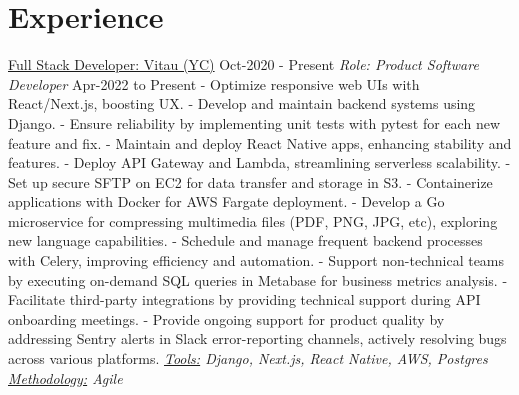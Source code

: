 \documentclass[letterpaper]{twentysecondcv} %
\begin{document}
\section{Experience}
\newline\newline 
{\large\underline{Full Stack Developer: Vitau (YC)}}  \hspace*{105pt}  Oct-2020 - Present
\newline\newline
{\textit{Role: Product Software Developer}} \hspace*{131pt} Apr-2022 to Present
    \newline- Optimize responsive web UIs with React/Next.js, boosting UX.
    \newline- Develop and maintain backend systems using Django.
    \newline- Ensure reliability by implementing unit tests with pytest for each new feature and fix.
    \newline- Maintain and deploy React Native apps, enhancing stability and features.
    \newline- Deploy API Gateway and Lambda, streamlining serverless scalability.
    \newline- Set up secure SFTP on EC2 for data transfer and storage in S3.
    \newline- Containerize applications with Docker for AWS Fargate deployment.
    \newline- Develop a Go microservice for compressing multimedia files (PDF, PNG, JPG, etc), exploring new language capabilities.
    \newline- Schedule and manage frequent backend processes with Celery, improving efficiency and automation.
    \newline- Support non-technical teams by executing on-demand SQL queries in Metabase for business metrics analysis.
    \newline- Facilitate third-party integrations by providing technical support during API onboarding meetings.
    \newline- Provide ongoing support for product quality by addressing Sentry alerts in Slack error-reporting channels, actively resolving bugs across various platforms.
    \newline\newline\textit{\underline{Tools:} Django, Next.js, React Native, AWS, Postgres \underline{Methodology:} Agile}
    \newline\newline
\end{document}
